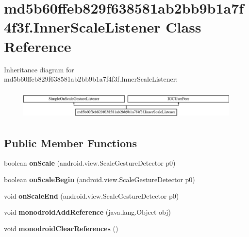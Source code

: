\hypertarget{classmd5b60ffeb829f638581ab2bb9b1a7f4f3f_1_1InnerScaleListener}{}\section{md5b60ffeb829f638581ab2bb9b1a7f4f3f.\+Inner\+Scale\+Listener Class Reference}
\label{classmd5b60ffeb829f638581ab2bb9b1a7f4f3f_1_1InnerScaleListener}
Inheritance diagram for md5b60ffeb829f638581ab2bb9b1a7f4f3f.\+Inner\+Scale\+Listener\+:\begin{figure}[H]
\begin{center}
\leavevmode
\includegraphics[height=1.559888cm]{classmd5b60ffeb829f638581ab2bb9b1a7f4f3f_1_1InnerScaleListener}
\end{center}
\end{figure}
\subsection*{Public Member Functions}
\begin{DoxyCompactItemize}
\item 
\mbox{\label{classmd5b60ffeb829f638581ab2bb9b1a7f4f3f_1_1InnerScaleListener_a9541f867e31a3ee001b6454b9dd02067}} 
boolean {\bfseries on\+Scale} (android.\+view.\+Scale\+Gesture\+Detector p0)
\item 
\mbox{\label{classmd5b60ffeb829f638581ab2bb9b1a7f4f3f_1_1InnerScaleListener_ace0e9a6c5689492acdb304345237b013}} 
boolean {\bfseries on\+Scale\+Begin} (android.\+view.\+Scale\+Gesture\+Detector p0)
\item 
\mbox{\label{classmd5b60ffeb829f638581ab2bb9b1a7f4f3f_1_1InnerScaleListener_ad1e5c4a080a15064afa8a879af6de198}} 
void {\bfseries on\+Scale\+End} (android.\+view.\+Scale\+Gesture\+Detector p0)
\item 
\mbox{\label{classmd5b60ffeb829f638581ab2bb9b1a7f4f3f_1_1InnerScaleListener_a376dba1ab8327e4c25355f35bae0a8d7}} 
void {\bfseries monodroid\+Add\+Reference} (java.\+lang.\+Object obj)
\item 
\mbox{\label{classmd5b60ffeb829f638581ab2bb9b1a7f4f3f_1_1InnerScaleListener_a642366a6c026d7fa42238967fa2abb21}} 
void {\bfseries monodroid\+Clear\+References} ()
\end{DoxyCompactItemize}
